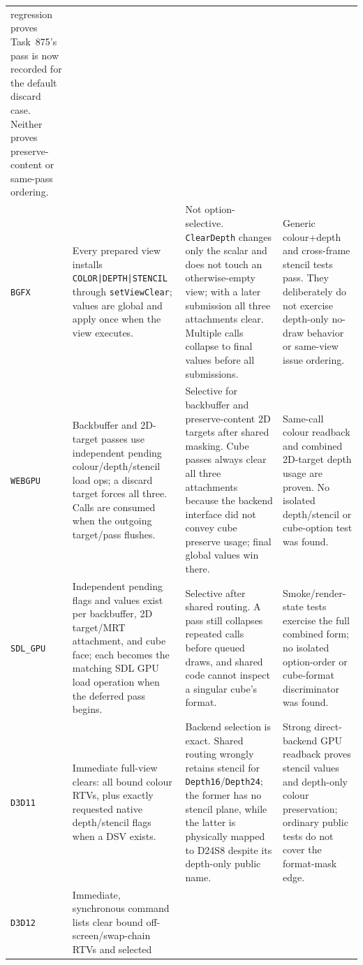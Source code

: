 \begin{longtable}{@{}p{}p{}p{}p{}@{}}
    regression proves Task~875's pass is now recorded for the default discard case. Neither
    proves preserve-content or same-pass ordering. \\
\texttt{BGFX}
  & Every prepared view installs
    \texttt{COLOR|DEPTH|STENCIL} through \texttt{setViewClear}; values are global and apply
    once when the view executes.
  & Not option-selective. \texttt{ClearDepth} changes only the scalar and does not touch an
    otherwise-empty view; with a later submission all three attachments clear. Multiple calls
    collapse to final values before all submissions.
  & Generic colour+depth and cross-frame stencil tests pass. They deliberately do not exercise
    depth-only no-draw behavior or same-view issue ordering. \\
\texttt{WEBGPU}
  & Backbuffer and 2D-target passes use independent pending colour/depth/stencil load ops;
    a discard target forces all three. Calls are consumed when the outgoing target/pass flushes.
  & Selective for backbuffer and preserve-content 2D targets after shared masking.
    Cube passes always clear all three attachments because the backend interface did not convey
    cube preserve usage; final global values win there.
  & Same-call colour readback and combined 2D-target depth usage are proven. No isolated
    depth/stencil or cube-option test was found. \\
\texttt{SDL\_GPU}
  & Independent pending flags and values exist per backbuffer, 2D target/MRT attachment, and
    cube face; each becomes the matching SDL GPU load operation when the deferred pass begins.
  & Selective after shared routing. A pass still collapses repeated calls before queued draws,
    and shared code cannot inspect a singular cube's format.
  & Smoke/render-state tests exercise the full combined form; no isolated option-order or
    cube-format discriminator was found. \\
\texttt{D3D11}
  & Immediate full-view clears: all bound colour RTVs, plus exactly requested native
    depth/stencil flags when a DSV exists.
  & Backend selection is exact. Shared routing wrongly retains stencil for
    \texttt{Depth16}/\texttt{Depth24}; the former has no stencil plane, while the latter is
    physically mapped to D24S8 despite its depth-only public name.
  & Strong direct-backend GPU readback proves stencil values and depth-only colour
    preservation; ordinary public tests do not cover the format-mask edge. \\
\texttt{D3D12}
  & Immediate, synchronous command lists clear bound off-screen/swap-chain RTVs and selected

\end{longtable}
